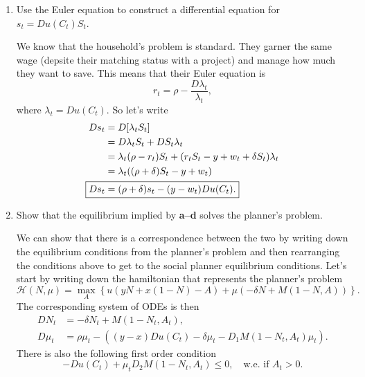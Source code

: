 \documentclass[11pt,english]{article}
\begin{document}
\begin{enumerate}
\begin{solution}
\begin{itemize}
\item $DS_t$ is simply the change in value of $S_t$.

\item $y - w_t$ represents the flow cost from the project generating $y$ units of the consumption good and needing to pay out $w_t$ in wages to the worker.

\item $-\delta S_t$ represents the expected loss in value from the project potentially dieing.
\end{itemize}
    \end{solution}
 
    \item[\textbf{d.}] Use the Euler equation to construct a differential
        equation for $s_t = Du(C_t)S_t$.
    \begin{solution}
We know that the household's problem is standard. They garner the same wage (depsite their matching status with a project) and manage how much they want to save. This means that their Euler equation is $$r_t = \rho - \frac{D\lambda_t}{\lambda_t},$$where $\lambda_t = Du(C_t)$. So let's write
\begin{align*}
Ds_t &= D[\lambda_t S_t]\\
 &= D\lambda_t S_t + DS_t \lambda_t\\
&= \lambda_t( \rho - r_t)S_t + (r_tS_t - y + w_t + \delta S_t)\lambda_t\\
&= \lambda_t((\rho + \delta)S_t - y + w_t)\\
\Aboxed{Ds_t &= (\rho + \delta)s_t - (y - w_t)Du(C_t).}
\end{align*}
    \end{solution}
 
    \item[\textbf{e.}] Show that the equilibrium implied by \textbf{a--d}
        solves the planner's problem.
    \begin{solution}
 We can show that there is a correspondence between the two by writing down the equilibrium conditions from the planner's problem and then rearranging the conditions above to get to the social planner equilibrium conditions. Let's start by writing down the hamiltonian that represents the planner's problem
$$\mathcal{H}(N, \mu) = \max_{A}\left\{u( yN+ x(1 - N) - A) + \mu(-\delta N + M(1 - N, A))\right\}.$$The corresponding system of ODEs is then
\begin{align*}
DN_t &= -\delta N_t + M(1 - N_t, A_t),\\
D\mu_t &= \rho \mu_t - ((y - x)Du(C_t) - \delta \mu_t - D_1M(1 - N_t, A_t)\mu_t).
\end{align*} There is also the following first order condition
$$-Du(C_t) + \mu_tD_2M(1 - N_t, A_t) \leq 0, \quad \text{w.e. if }A_t > 0.$$


\end{solution}
\end{enumerate}
\end{document}
